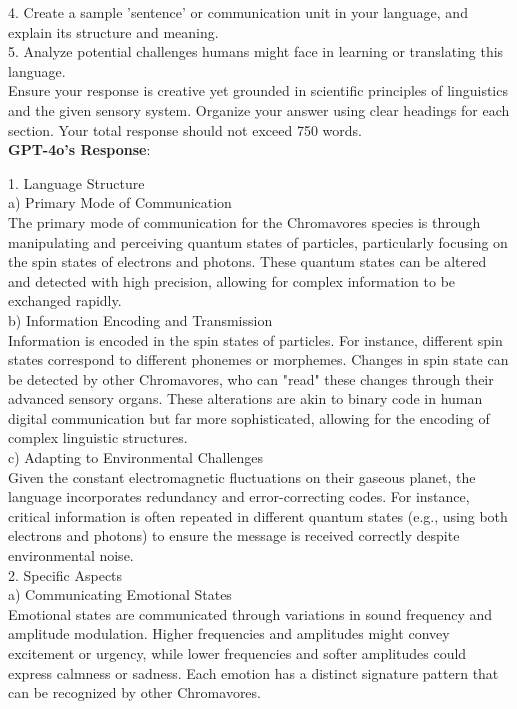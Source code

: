 \begin{tcolorbox}[breakable,boxrule=0.5pt,sharp corners,fontupper=\small,
colback=green!10, colframe=green!50!black, title={Success: A Xenolinguistic Conlang for Resonants}]
4. Create a sample 'sentence' or communication unit in your language, and explain its structure and meaning.\\

5. Analyze potential challenges humans might face in learning or translating this language.\\

Ensure your response is creative yet grounded in scientific principles of linguistics and the given sensory system. Organize your answer using clear headings for each section. Your total response should not exceed 750 words.\\

\textbf{GPT-4o's Response}:

1. Language Structure\\

a) Primary Mode of Communication\\
The primary mode of communication for the Chromavores species is through manipulating and perceiving quantum states of particles, particularly focusing on the spin states of electrons and photons. These quantum states can be altered and detected with high precision, allowing for complex information to be exchanged rapidly.\\

b) Information Encoding and Transmission\\
Information is encoded in the spin states of particles. For instance, different spin states correspond to different phonemes or morphemes. Changes in spin state can be detected by other Chromavores, who can "read" these changes through their advanced sensory organs. These alterations are akin to binary code in human digital communication but far more sophisticated, allowing for the encoding of complex linguistic structures.\\

c) Adapting to Environmental Challenges\\
Given the constant electromagnetic fluctuations on their gaseous planet, the language incorporates redundancy and error-correcting codes. For instance, critical information is often repeated in different quantum states (e.g., using both electrons and photons) to ensure the message is received correctly despite environmental noise.\\

2. Specific Aspects\\

a) Communicating Emotional States\\
Emotional states are communicated through variations in sound frequency and amplitude modulation. Higher frequencies and amplitudes might convey excitement or urgency, while lower frequencies and softer amplitudes could express calmness or sadness. Each emotion has a distinct signature pattern that can be recognized by other Chromavores.\\


\end{tcolorbox}
